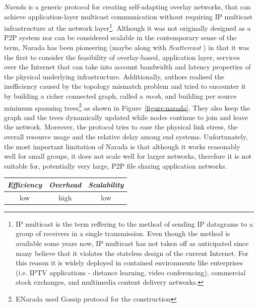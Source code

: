 \emph{Narada} \cite{chu_esm_2000,chu_esm_2001,chu_esm_2002} is a generic
protocol for creating self-adapting overlay networks, that can achieve
application-layer multicast communication without requiring IP multicast
infrastructure at the network layer\footnote{
  IP multicast is the term reffering to the method of sending IP datagrams to a
  group of receivers in a single transmission. Even though the method is
  available some years now, IP multicast has not taken off as anticipated since
  many believe that it violates the stateless design of the current Internet.
  For this reason it is widely deployed in contained environments like
  enterprises (i.e. IPTV applications - distance learning, video conferencing),
  commercial stock exchanges, and multimedia content delivery networks.
}. Although it was not originally designed as a P2P system nor can be considered
scalable in the contemporary sense of the term, Narada has been pioneering
(maybe along with \emph{Scattercast} \cite{chawathe_scattercast_2000}) in that
it was the first to consider the feasibility of overlay-based, application
layer, services over the Internet that can take into account bandwidth and
latency properties of the physical underlying infrastructure. Additionally,
authors realised the inefficiency caused by the topology mismatch problem and
tried to encounter it by building a richer connected graph, called a
\emph{mesh}, and building per source minimum spanning trees\footnote{
  ENarada \cite{li_enarada_2008} used Gossip protocol for the construction
}
as shown in Figure~\ref{figure:narada}. They also keep the graph and the trees
dynamically updated while nodes continue to join and leave the network.
Moreover, the protocol tries to ease the physical link stress, the overall
resource usage and the relative delay among end systems. Unfortunately, the most
important limitation of Narada is that although it works reasonably well for
small groups, it does not scale well for larger networks, therefore it is not
suitable for, potentially very large, P2P file sharing application networks.

\begin{center}
\begin{tabular}{ccc}
\emph{Efficiency} & \emph{Overhead} & \emph{Scalability} \\
\hline
%
low &
high &
%
low
\end{tabular}
\end{center}

